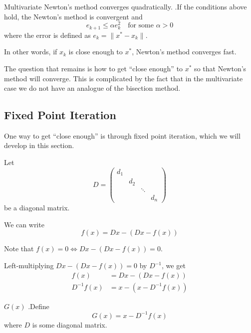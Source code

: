 \documentclass[12pt,letterpaper]{article}
\begin{document}
\begin{theo}{Multivariate Newton's method converges quadratically.}
.If the conditions above hold, the Newton's method is convergent and
\begin{equation}
	e_{k+1} \leq \alpha e_k^2 \quad \text{for some } \alpha > 0
\end{equation}
where the error is defined as $e_k = \lVert x^* - x_k \rVert$.
\end{theo}

In other words, if $x_k$ is close enough to $x^*$, Newton's method converges fast.

The question that remains is how to get ``close enough'' to $x^*$ so that Newton's method will converge. This is complicated by the fact that in the multivariate case we do not have an analogue of the bisection method.

\subsection{Fixed Point Iteration}

One way to get ``close enough'' is through fixed point iteration, which we will develop in this section.

Let
\begin{equation}
D = \begin{pmatrix}
	d_1 \\
	& d_2 \\
	& & \ddots \\
	& & & d_n
\end{pmatrix}
\end{equation}
be a diagonal matrix.

We can write
\begin{equation}
	f(x) = Dx - (Dx - f(x))
\end{equation}

Note that $f(x) = 0 \iff Dx - (Dx - f(x)) = 0$.

Left-multiplying $Dx - (Dx - f(x)) = 0$ by $D^{-1}$, we get
\begin{align}
	f(x) &= Dx - (Dx - f(x)) \\
	D^{-1} f(x) &= x - (x - D^{-1}f(x)) \label{eq:multi_1}
\end{align}

\begin{constr}{$G(x)$}
.Define
\begin{equation}
	G(x) = x - D^{-1}f(x)
\end{equation}
where $D$ is some diagonal matrix.
\end{constr}
\end{document}
